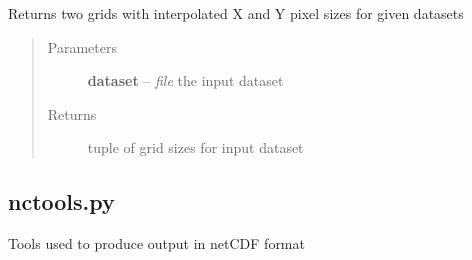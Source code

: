 \documentclass[letterpaper,10pt,english]{sphinxmanual}
\begin{document}

\begin{fulllineitems}
\label{docs/utilities:get_pixel_size_grid.get_pixel_size_grids}
Returns two grids with interpolated X and Y pixel sizes for given datasets
\begin{quote}\begin{description}
\item[{Parameters}] \leavevmode
\textbf{dataset} -- \emph{file} the input dataset

\item[{Returns}] \leavevmode
tuple of  grid sizes for input dataset

\end{description}\end{quote}

\end{fulllineitems}



\subsection{nctools.py}
\label{docs/utilities:nctools-py}\label{docs/utilities:module-nctools}
Tools used to produce output in netCDF format

\end{document}
